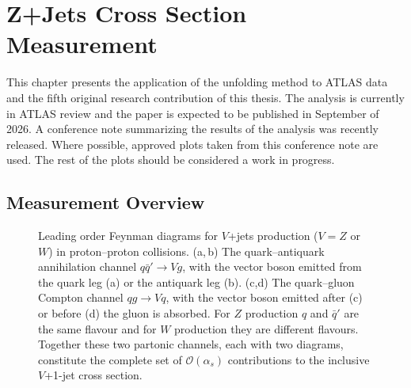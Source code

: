 
\chapter{Z+Jets Cross Section Measurement}
\label{ch:zjets}

This chapter presents the application of the \Omnifold unfolding method to ATLAS data and the fifth original research contribution of this thesis.
The analysis is currently in ATLAS review and the paper is expected to be published in September of 2026.
A conference note summarizing the results of the analysis was recently released.
Where possible, approved plots taken from this conference note are used.
The rest of the plots should be considered a work in progress.

\section{Measurement Overview}
\label{sec:zjets-overview}

\begin{figure}[htb]
    \centering
    
    \caption{Leading order Feynman diagrams for $V$+jets production ($V = Z$ or $W$) in proton--proton collisions.
    (a,\,b) The quark--antiquark annihilation channel $q\bar{q}' \to V g$, with the vector boson emitted from the quark leg (a) or the antiquark leg (b).
    (c,d) The quark--gluon Compton channel $qg \to Vq$, with the vector boson emitted after (c) or before (d) the gluon is absorbed.
    For $Z$ production $q$ and $\bar{q}'$ are the same flavour and for $W$ production they are different flavours.
    Together these two partonic channels, each with two diagrams, constitute the complete set of $\mathcal{O}(\alpha_s)$ contributions to the inclusive $V$+1-jet cross section.}
    \label{fig:zjets-lo-diagrams}
\end{figure}

